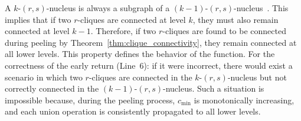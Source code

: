 A $k$-$(r,s)$-nucleus is always a subgraph of a $(k-1)$-$(r,s)$-nucleus~\cite{firstNucleus}. This implies that if two $r$-cliques are connected at level $k$, they must also remain connected at level $k-1$.
Therefore, if two $r$-cliques are found to be connected during peeling by Theorem~\ref{thm:clique_connectivity}, they remain connected at all lower levels. This property defines the behavior of the \UniteLevel function.
%
For the correctness of the early return (Line~6): 
if it were incorrect, there would exist a scenario in which two $r$-cliques are connected in the $k$-$(r,s)$-nucleus but not correctly connected in the $(k\!-\!1)$-$(r,s)$-nucleus. 
Such a situation is impossible because, during the peeling process, $c_{\min}$ is monotonically increasing, and each union operation is consistently propagated to all lower levels.




